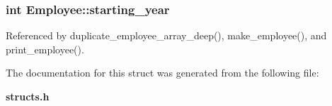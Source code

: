 \subsubsection[{starting\+\_\+year}]{\setlength{\rightskip}{0pt plus 5cm}int Employee\+::starting\+\_\+year}\label{structEmployee_a2185965b96ee8472073bee2ee7004e58}


Referenced by duplicate\+\_\+employee\+\_\+array\+\_\+deep(), make\+\_\+employee(), and print\+\_\+employee().



The documentation for this struct was generated from the following file\+:\begin{DoxyCompactItemize}
\item 
{\bf structs.\+h}\end{DoxyCompactItemize}
